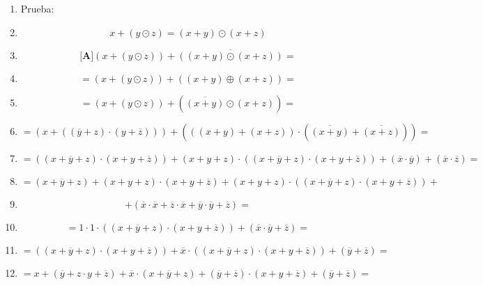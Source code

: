 \begin{enumerate}
\begin{enumerate}
\begin{enumerate}
\begin{enumerate}
        \begin{enumerate}
        \def\labelenumv{\arabic{enumv}.}
        \tightlist
        \item
          Prueba:
        \item
          \[{{x + {({y \odot z})}} = {({x + y})}} \odot {({x + z})}\]
        \item
          \[{\lbrack\mathbf{A}\rbrack}{{{({x + {({y \odot z})}})} + \overline{({{({x+y})}\odot{({x+z})}})}} =}\]
        \item
          \[{= {{({x + {({y \odot z})}})} + {({{({x + y})} \oplus {({x + z})}})}}} =\]
        \item
          \[{= {{({x + {({y \odot z})}})} + {({\overline{({x+y})} \odot {({x + z})}})}}} =\]
        \item
          \[{= {{({x + {({{({\overline{y} + z})} \cdot {({y + \overline{z}})}})}})} + {({{({{({x + y})} + {({x + z})}})} \cdot {({\overline{({x+y})} + \overline{({x+z})}})}})}}} =\]
        \item
          \[{= {{{{({{({{x + \overline{y}} + z})} \cdot {({{x + y} + \overline{z}})}})} + {{({{x + y} + z})} \cdot {({{({{x + \overline{y}} + z})} \cdot {({{x + y} + \overline{z}})}})}}} + {({\overline{x} \cdot \overline{y}})}} + {({\overline{x} \cdot \overline{z}})}}} =\]
        \item
          \[= {{{{({{x + \overline{y}} + z})} + {{({{x + y} + z})} \cdot {({{x + y} + \overline{z}})}}} + {{({{x + y} + z})} \cdot {({{({{x + \overline{y}} + z})} \cdot {({{x + y} + \overline{z}})}})}}} +}\]
        \item
          \[{+ {({{{{\overline{x} \cdot \overline{x}} + {\overline{z} \cdot \overline{x}}} + {\overline{y} \cdot \overline{y}}} + \overline{z}})}} =\]
        \item
          \[{= {{{1 \cdot 1} \cdot {({{({{x + \overline{y}} + z})} \cdot {({{x + y} + \overline{z}})}})}} + {({{\overline{x} \cdot \overline{y}} + \overline{z}})}}} =\]
        \item
          \[{= {{{({{({{x + \overline{y}} + z})} \cdot {({{x + y} + \overline{z}})}})} + {\overline{x} \cdot {({{({{x + \overline{y}} + z})} \cdot {({{x + y} + \overline{z}})}})}}} + {({\overline{y} + \overline{z}})}}} =\]
        \item
          \[{= {{{{x + {({{\overline{y} + {z \cdot y}} + \overline{z}})}} + {\overline{x} \cdot {({{x + \overline{y}} + z})}}} + {{({\overline{y} + \overline{z}})} \cdot {({{x + y} + \overline{z}})}}} + {({\overline{y} + \overline{z}})}}} =\]

\end{enumerate}
\end{enumerate}
\end{enumerate}
\end{enumerate}
\end{enumerate}
